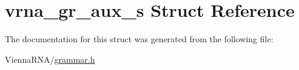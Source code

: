 \hypertarget{structvrna__gr__aux__s}{}\section{vrna\+\_\+gr\+\_\+aux\+\_\+s Struct Reference}
\label{structvrna__gr__aux__s}


The documentation for this struct was generated from the following file\+:\begin{DoxyCompactItemize}
\item 
Vienna\+R\+N\+A/\hyperlink{grammar_8h}{grammar.\+h}\end{DoxyCompactItemize}
